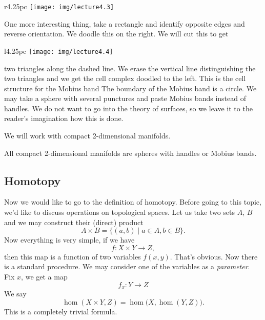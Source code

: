 \begin{wrapfigure}{r}{4.25pc}
  \vspace{-24pt}
  \texttt{[image: img/lecture4.3]}
  \vspace{-24pt}
\end{wrapfigure}
One more interesting thing, take a rectangle and identify
opposite edges and reverse orientation. We doodle this on the
right. We will cut this to get 

\begin{wrapfigure}{l}{4.25pc}
  \vspace{-16pt}
  \texttt{[image: img/lecture4.4]}
  \vspace{-16pt}
\end{wrapfigure}
\noindent two triangles along the dashed
line. We erase the vertical line distinguishing the two
triangles and we get the cell complex doodled to the left. This
is the cell structure for the Mobius band
The boundary of the Mobius band is a circle. We may take a sphere
with several punctures and paste Mobius bands instead of
handles. We do not want to go into the theory of surfaces, so we
leave it to the reader's imagination how this is done.

We will work with compact 2-dimensional manifolds.

\begin{thm}
All compact 2-dimensional manifolds are spheres with handles or
Mobius bands.
\end{thm}

\subsection{Homotopy}
Now we would like to go to the definition of homotopy. Before
going to this topic, we'd like to discuss operations on
topological spaces. Let us take two sets $A$, $B$ and we may
construct their (direct) product
\begin{equation}
A\times B=\{(a,b)\mid a\in A, b\in B\}.
\end{equation}
Now everything is very simple, if we have
\begin{equation}
f\colon X\times Y\to Z,
\end{equation}
then this map is a function of two variables $f(x,y)$. That's
obvious. Now there is a standard procedure. We may consider one
of the variables as a \emph{parameter}. Fix $x$, we get a map
\begin{equation}
f_{x}\colon Y\to Z
\end{equation}
We say
\begin{equation}
\hom(X\times Y,Z)=\hom\bigl(X,\hom(Y,Z)\bigr).
\end{equation}
This is a completely trivial formula.

